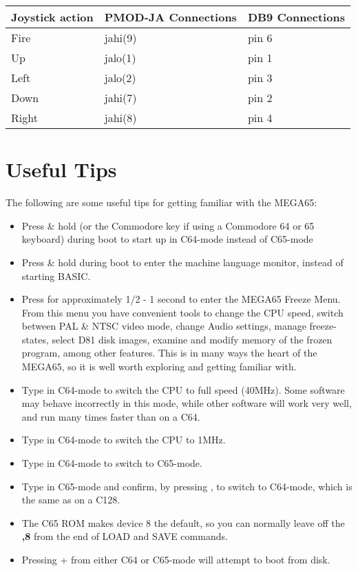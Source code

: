 \begin{minipage}{\linewidth}
\begin{center}
  \begin{longtable}{|L{3cm}|L{3cm}|p{3cm}|}
    \hline
    {\textbf{Joystick action}} & {\textbf{PMOD-JA Connections}} & {\textbf{DB9 Connections}} \\
    \hline
    {Fire} & {jahi(9)} & {pin 6} \\
    \hline
    {Up} & {jalo(1)} & {pin 1} \\
    \hline
    {Left} & {jalo(2)} & {pin 3} \\
    \hline
    {Down} & {jahi(7)} & {pin 2} \\
    \hline
    {Right} & {jahi(8)} & {pin 4} \\
    \hline
  \end{longtable}
\end{center}
\end{minipage}


\section{Useful Tips}

The following are some useful tips for getting familiar with the MEGA65:

\begin{itemize}

\item{Press \& hold \megasymbolkey (or the Commodore key if using a Commodore 64 or 65 keyboard) during boot to start up in C64-mode instead of C65-mode}
 \item{Press \& hold  during boot to enter the machine language monitor, instead of starting BASIC.}
\item{Press  for approximately 1/2 - 1 second to enter the MEGA65 Freeze Menu.  From this menu
  you have convenient tools to change the CPU speed, switch between PAL \& NTSC video mode, change Audio settings, manage freeze-states,
   select D81 disk images, examine and modify memory of the frozen program, among other features.  This is in many ways the heart of the MEGA65, so it is well worth exploring and getting familiar with.}
\item{Type  in C64-mode to switch  the CPU to full speed (40MHz). Some software may behave incorrectly in this mode, while other software will work very well, and run many times faster than on a C64.}
\item{Type  in C64-mode to switch the CPU to 1MHz.}
\item{Type  in C64-mode to switch to C65-mode.}
\item{Type  in C65-mode and confirm, by pressing , to switch to C64-mode, which is the
same as on a C128.}
\item{The C65 ROM makes device 8 the default, so you can normally leave off the \textbf{,8} from the end of LOAD and SAVE commands.}
\item{Pressing  +  from either C64 or C65-mode will attempt to boot from disk.}
\end{itemize}

